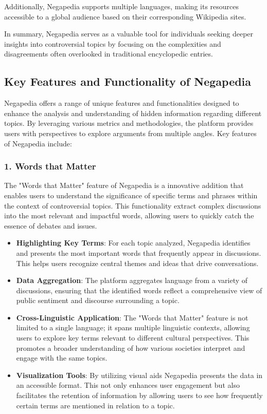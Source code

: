 Additionally, Negapedia supports multiple languages, making its resources accessible to a global audience based on their corresponding Wikipedia sites.

In summary, Negapedia serves as a valuable tool for individuals seeking deeper insights into controversial topics by focusing on the complexities and disagreements often overlooked in traditional encyclopedic entries.

\subsection{Key Features and Functionality of Negapedia}
\label{subsec:key_features_and_functionality_of_negapedia}

Negapedia offers a range of unique features and functionalities designed to enhance the analysis and understanding of hidden information regarding different topics. By leveraging various metrics and methodologies, the platform provides users with perspectives to explore arguments from multiple angles. Key features of Negapedia include:

\subsubsection{1. Words that Matter}

The "Words that Matter" feature of Negapedia is a innovative addition that enables users to understand the significance of specific terms and phrases within the context of controversial topics. This functionality extract complex discussions into the most relevant and impactful words, allowing users to quickly catch the essence of debates and issues.

\begin{itemize}
    \item \textbf{Highlighting Key Terms}: For each topic analyzed, Negapedia identifies and presents the most important words that frequently appear in discussions. This helps users recognize central themes and ideas that drive conversations.
    \item \textbf{Data Aggregation}: The platform aggregates language from a variety of discussions, ensuring that the identified words reflect a comprehensive view of public sentiment and discourse surrounding a topic.
    \item \textbf{Cross-Linguistic Application}: The "Words that Matter" feature is not limited to a single language; it spans multiple linguistic contexts, allowing users to explore key terms relevant to different cultural perspectives. This promotes a broader understanding of how various societies interpret and engage with the same topics.
    \item \textbf{Visualization Tools}: By utilizing visual aids Negapedia presents the data in an accessible format. This not only enhances user engagement but also facilitates the retention of information by allowing users to see how frequently certain terms are mentioned in relation to a topic.
\end{itemize}

